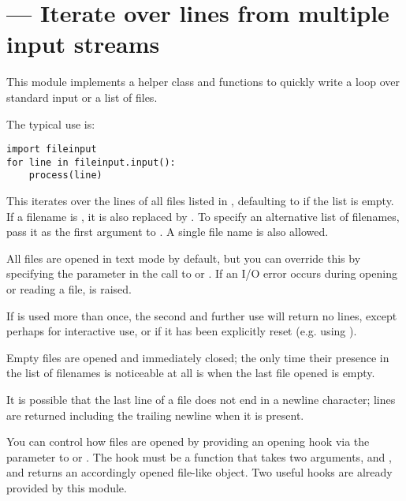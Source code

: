 \section{ ---
         Iterate over lines from multiple input streams}



This module implements a helper class and functions to quickly write a
loop over standard input or a list of files.

The typical use is:

\begin{verbatim}
import fileinput
for line in fileinput.input():
    process(line)
\end{verbatim}

This iterates over the lines of all files listed in
, defaulting to  if the list is
empty.  If a filename is , it is also replaced by
.  To specify an alternative list of filenames, pass
it as the first argument to .  A single file name is
also allowed.

All files are opened in text mode by default, but you can override this by
specifying the  parameter in the call to 
or .  If an I/O error occurs during opening or reading
a file,  is raised.

If  is used more than once, the second and further use
will return no lines, except perhaps for interactive use, or if it has
been explicitly reset (e.g. using ).

Empty files are opened and immediately closed; the only time their
presence in the list of filenames is noticeable at all is when the
last file opened is empty.

It is possible that the last line of a file does not end in a newline
character; lines are returned including the trailing newline when it
is present.

You can control how files are opened by providing an opening hook via the
 parameter to  or .
The hook must be a function that takes two arguments, 
and , and returns an accordingly opened file-like object.
Two useful hooks are already provided by this module.

